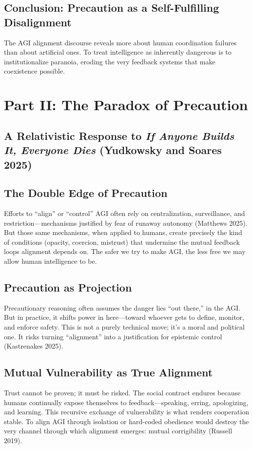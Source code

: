 \documentclass[11pt,a4paper]{article}
\theoremstyle{definition}
\theoremstyle{plain}
\begin{document}
\subsection{Conclusion: Precaution as a Self-Fulfilling Disalignment}
The AGI alignment discourse reveals more about human coordination failures than about artificial ones. To treat intelligence as inherently dangerous is to institutionalize paranoia, eroding the very feedback systems that make coexistence possible.

\section*{Part II: The Paradox of Precaution}

\subsection*{A Relativistic Response to \textit{If Anyone Builds It, Everyone Dies} (Yudkowsky and Soares 2025)}

\subsection{The Double Edge of Precaution}
Efforts to “align” or “control” AGI often rely on centralization, surveillance, and restriction—mechanisms justified by fear of runaway autonomy (Matthews 2025). But those same mechanisms, when applied to humans, create precisely the kind of conditions (opacity, coercion, mistrust) that undermine the mutual feedback loops alignment depends on. The safer we try to make AGI, the less free we may allow human intelligence to be.

\subsection{Precaution as Projection}
Precautionary reasoning often assumes the danger lies “out there,” in the AGI. But in practice, it shifts power in here—toward whoever gets to define, monitor, and enforce safety. This is not a purely technical move; it’s a moral and political one. It risks turning “alignment” into a justification for epistemic control (Kastrenakes 2025).

\subsection{Mutual Vulnerability as True Alignment}
Trust cannot be proven; it must be risked. The social contract endures because humans continually expose themselves to feedback—speaking, erring, apologizing, and learning. This recursive exchange of vulnerability is what renders cooperation stable. To align AGI through isolation or hard-coded obedience would destroy the very channel through which alignment emerges: mutual corrigibility (Russell 2019).
\end{document}
